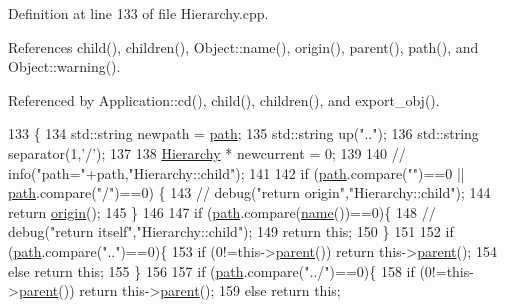 Definition at line 133 of file Hierarchy.\+cpp.



References child(), children(), Object\+::name(), origin(), parent(), path(), and Object\+::warning().



Referenced by Application\+::cd(), child(), children(), and export\+\_\+obj().


\begin{DoxyCode}
133                                          \{
134   std::string newpath = \hyperlink{classHierarchy_aa7990fa7caf132d83e361ce033c6c65a}{path};
135   std::string up(\textcolor{stringliteral}{".."});
136   std::string separator(1,\textcolor{charliteral}{'/'});
137 
138   \hyperlink{classHierarchy}{Hierarchy} * newcurrent = 0;
139 
140   \textcolor{comment}{//  info("path="+path,"Hierarchy::child");}
141 
142   \textcolor{keywordflow}{if} (\hyperlink{classHierarchy_aa7990fa7caf132d83e361ce033c6c65a}{path}.compare(\textcolor{stringliteral}{""})==0 || \hyperlink{classHierarchy_aa7990fa7caf132d83e361ce033c6c65a}{path}.compare(\textcolor{stringliteral}{"/"})==0) \{
143     \textcolor{comment}{//    debug("return origin","Hierarchy::child");}
144     \textcolor{keywordflow}{return} \hyperlink{classHierarchy_aee461dc930ce3871636ff87f075b1b83}{origin}();
145   \}
146 
147   \textcolor{keywordflow}{if} (\hyperlink{classHierarchy_aa7990fa7caf132d83e361ce033c6c65a}{path}.compare(\hyperlink{classObject_a300f4c05dd468c7bb8b3c968868443c1}{name}())==0)\{
148     \textcolor{comment}{//    debug("return itself","Hierarchy::child");}
149     \textcolor{keywordflow}{return} \textcolor{keyword}{this};
150   \}
151 
152   \textcolor{keywordflow}{if} (\hyperlink{classHierarchy_aa7990fa7caf132d83e361ce033c6c65a}{path}.compare(\textcolor{stringliteral}{".."})==0)\{
153     \textcolor{keywordflow}{if} (0!=this->\hyperlink{classHierarchy_a1c7bec8257e717f9c1465e06ebf845fc}{parent}()) \textcolor{keywordflow}{return} this->\hyperlink{classHierarchy_a1c7bec8257e717f9c1465e06ebf845fc}{parent}();
154     \textcolor{keywordflow}{else} \textcolor{keywordflow}{return} \textcolor{keyword}{this};
155   \}
156 
157   \textcolor{keywordflow}{if} (\hyperlink{classHierarchy_aa7990fa7caf132d83e361ce033c6c65a}{path}.compare(\textcolor{stringliteral}{"../"})==0)\{
158     \textcolor{keywordflow}{if} (0!=this->\hyperlink{classHierarchy_a1c7bec8257e717f9c1465e06ebf845fc}{parent}()) \textcolor{keywordflow}{return} this->\hyperlink{classHierarchy_a1c7bec8257e717f9c1465e06ebf845fc}{parent}();
159     \textcolor{keywordflow}{else} \textcolor{keywordflow}{return} \textcolor{keyword}{this};

\end{DoxyCode}
